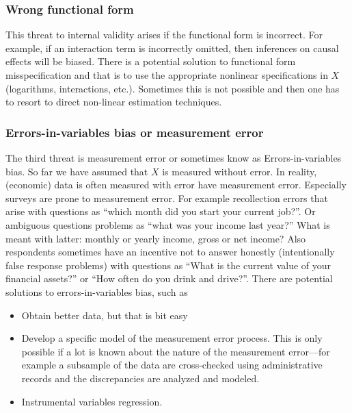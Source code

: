 \documentclass[
]{book}
\providecommand{\tightlist}{%
  \setlength{\itemsep}{0pt}\setlength{\parskip}{0pt}}
\begin{document}
\hypertarget{wrong-functional-form}{%
\subsubsection{Wrong functional form}\label{wrong-functional-form}}

This threat to internal validity arises if the functional form is incorrect. For example, if an interaction term is incorrectly omitted, then inferences on causal effects will be biased. There is a potential solution to functional form misspecification and that is to use the appropriate nonlinear specifications in \(X\) (logarithms, interactions, etc.). Sometimes this is not possible and then one has to resort to direct non-linear estimation techniques.

\hypertarget{errors-in-variables-bias-or-measurement-error}{%
\subsubsection{Errors-in-variables bias or measurement error}\label{errors-in-variables-bias-or-measurement-error}}

The third threat is measurement error or sometimes know as Errors-in-variables bias. So far we have assumed that \(X\) is measured without error. In reality, (economic) data is often measured with error have measurement error. Especially surveys are prone to measurement error. For example recollection errors that arise with questions as ``which month did you start your current job?''. Or ambiguous questions problems as ``what was your income last year?'' What is meant with latter: monthly or yearly income, gross or net income? Also respondents sometimes have an incentive not to answer honestly (intentionally false response problems) with questions as ``What is the current value of your financial assets?'' or ``How often do you drink and drive?''. There are potential solutions to errors-in-variables bias, such as

\begin{itemize}
\tightlist
\item
  Obtain better data, but that is bit easy
\item
  Develop a specific model of the measurement error process. This is only possible if a lot is known about the nature of the measurement error---for example a subsample of the data are cross-checked using administrative records and the discrepancies are analyzed and modeled.
\item
  Instrumental variables regression.
\end{itemize}
\end{document}
